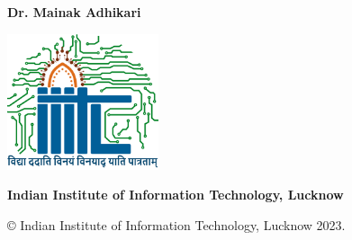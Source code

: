 \begin{center}
    \vspace{0.1cm}

    {\bf{Dr. Mainak Adhikari}}


    \vspace{1.3cm}

    \includegraphics[height=4cm]{./Images/Logo_IIITL.png}

    {\bf\large{Indian Institute of Information Technology, Lucknow}}\\
    {\bf{}}
\end{center}

\medskip

\centerline{ \copyright{} Indian Institute of Information Technology, Lucknow 2023.}

\cleardoublepage







